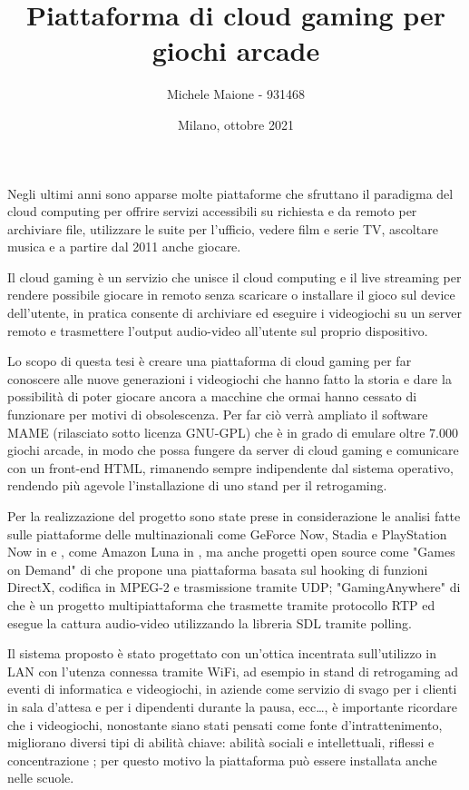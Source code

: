 \documentclass{article} %
\title{Piattaforma di cloud gaming per giochi arcade}
\author{Michele Maione - 931468}
\date{Milano, ottobre 2021}
\begin{document}
\maketitle
{}

Negli ultimi anni sono apparse molte piattaforme che sfruttano il paradigma del cloud computing per offrire servizi accessibili su richiesta e da remoto per archiviare file, utilizzare le suite per l'ufficio, vedere film e serie TV, ascoltare musica e a partire dal 2011 anche giocare.

Il cloud gaming è un servizio che unisce il cloud computing e il live streaming per rendere possibile giocare in remoto senza scaricare o installare il gioco sul device dell'utente, in pratica consente di archiviare ed eseguire i videogiochi su un server remoto e trasmettere l'output audio-video all'utente sul proprio dispositivo.

Lo scopo di questa tesi è creare una piattaforma di cloud gaming per far conoscere alle nuove generazioni i videogiochi che hanno fatto la storia e dare la possibilità di poter giocare ancora a macchine che ormai hanno cessato di funzionare per motivi di obsolescenza. Per far ciò verrà ampliato il software MAME (rilasciato sotto licenza GNU-GPL) che è in grado di emulare oltre $7.000$ giochi arcade, in modo che possa fungere da server di cloud gaming e comunicare con un front-end HTML, rimanendo sempre indipendente dal sistema operativo, rendendo più agevole l'installazione di uno stand per il retrogaming. 

Per la realizzazione del progetto sono state prese in considerazione le analisi fatte sulle piattaforme delle multinazionali come GeForce Now, Stadia e PlayStation Now in \parencite{A_Network_Analysis_on_Cloud_Gaming_Stadia_GeForce_Now_and_PSNow} e \parencite{Network_Analysis_of_the_Sony_Remote_Play_System}, come Amazon Luna in \parencite{Amazon_Luna_WebRTC}, ma anche progetti open source come "Games on Demand" di \parencite{ARealTimeStreamingGamesonDemandSystem} che propone una piattaforma basata sul hooking di funzioni DirectX, codifica in MPEG-2 e trasmissione tramite UDP; "GamingAnywhere" di \parencite{GamingAnywhere} che è un progetto multipiattaforma che trasmette tramite protocollo RTP ed esegue la cattura audio-video utilizzando la libreria SDL tramite polling.

Il sistema proposto è stato progettato con un'ottica incentrata sull'utilizzo in LAN con l'utenza connessa tramite WiFi, ad esempio in stand di retrogaming ad eventi di informatica e videogiochi, in aziende come servizio di svago per i clienti in sala d'attesa e per i dipendenti durante la pausa, ecc\dots, è importante ricordare che i videogiochi, nonostante siano stati pensati come fonte d'intrattenimento, migliorano diversi tipi di abilità chiave: abilità sociali e intellettuali, riflessi e concentrazione \parencite{Use_of_Cloud_Gaming_in_Education}; per questo motivo la piattaforma può essere installata anche nelle scuole.
\end{document}
